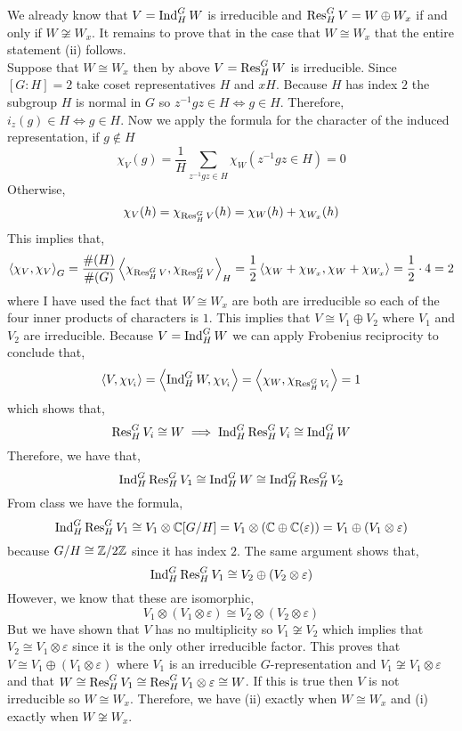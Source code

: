 \documentclass[12pt]{extarticle}
\begin{document}
We already know that $V = \mathrm{Ind}^{G}_{H} \, W$ is irreducible and $ \mathrm{Res}^{G}_{H} \, V = W \oplus W_x$ if and only if $W \not\cong W_x$. It remains to prove that in the case that $W \cong W_x$ that the entire statement (ii) follows. \bigskip\\
Suppose that $W \cong W_x$ then by above $V =  \mathrm{Res}^{G}_{H} \, W$ is irreducible. Since $[G : H] = 2$ take coset representatives $H$ and $x H$. Because $H$ has index $2$ the subgroup $H$ is normal in $G$ so $z^{-1} g z \in H \iff g \in H$. Therefore, $i_z(g) \in H \iff g \in H$. Now we apply the formula for the character of the induced representation, if $g \notin H$
\[ \chi_{V}(g) = \frac{1}{H} \sum_{z^{-1} g z \in H} \chi_W(z^{-1} g z \in H) = 0 \]
Otherwise, 
\[ \chi_{V}(h) = \chi_{\mathrm{Res}^{G}_{H} \, V}(h) = \chi_W(h) + \chi_{W_x}(h) \] 
This implies that,
\[ \left< \chi_V, \chi_V \right>_G = \frac{\#(H)}{\#(G)} \left< \chi_{\mathrm{Res}^{G}_{H} \, V}, \chi_{\mathrm{Res}^{G}_{H} \, V} \right>_H = \frac{1}{2} \left< \chi_W + \chi_{W_x}, \chi_W + \chi_{W_x} \right> = \frac{1}{2} \cdot 4 = 2\]
where I have used the fact that $W \cong W_x$ are both are irreducible so each of the four inner products of characters is $1$. This implies that $V \cong V_1 \oplus V_2$ where $V_1$ and $V_2$ are irreducible. Because $V = \mathrm{Ind}^{G}_{H} \, W$ we can apply Frobenius reciprocity to conclude that,
\[ \left< V, \chi_{V_i} \right> = \left< \mathrm{Ind}^{G}_{H} \, W, \chi_{V_i} \right> = \left< \chi_{W}, \chi_{\mathrm{Res}^{G}_{H} \, V_i} \right> = 1 \]
which shows that,
\[ \mathrm{Res}^{G}_{H} \, V_i \cong W \implies \mathrm{Ind}^{G}_{H} \, \mathrm{Res}^{G}_{H} \, V_i \cong \mathrm{Ind}^{G}_{H} \, W \]  
Therefore, we have that,
\[ \mathrm{Ind}^{G}_{H} \, \mathrm{Res}^{G}_{H} \, V_1 \cong \mathrm{Ind}^{G}_{H} \, W \cong \mathrm{Ind}^{G}_{H} \, \mathrm{Res}^{G}_{H} \, V_2 \]
From class we have the formula,
\[ \mathrm{Ind}^{G}_{H} \, \mathrm{Res}^{G}_{H} \, V_1 \cong V_1 \otimes \mathbb{C}[G/H] = V_1 \otimes (\mathbb{C} \oplus \mathbb{C}(\varepsilon)) = V_1 \oplus (V_1 \otimes \varepsilon) \]
because $G/H \cong \mathbb{Z}/ 2 \mathbb{Z}$ since it has index $2$. The same argument shows that,
\[ \mathrm{Ind}^{G}_{H} \, \mathrm{Res}^{G}_{H} \, V_1 \cong V_2 \oplus (V_2 \otimes \varepsilon) \]
However, we know that these are isomorphic,
\[ V_1 \otimes (V_1 \otimes \varepsilon) \cong V_2 \otimes (V_2 \otimes \varepsilon) \]
But we have shown that $V$ has no multiplicity so $V_1 \not\cong V_2$ which implies that $V_2 \cong V_1 \otimes \varepsilon$ since it is the only other irreducible factor. This proves that $V \cong V_1 \oplus (V_1 \otimes \varepsilon)$ where $V_1$ is an irreducible $G$-representation and $V_1 \not\cong V_1 \otimes \varepsilon$ and that $W \cong \mathrm{Res}^{G}_{H} \, V_1 \cong \mathrm{Res}^{G}_{H} \, V_1 \otimes \varepsilon \cong W$. If this is true then $V$ is not irreducible so $W \cong W_x$. Therefore, we have (ii) exactly when $W \cong W_x$ and (i) exactly when $W \not\cong W_x$. 
\end{document}
